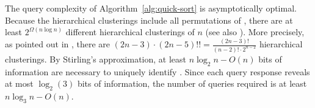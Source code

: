 The query complexity of 
Algorithm~\ref{alg:quick-sort} is asymptotically optimal.
Because the hierarchical clusterings include all permutations
of \AllElements,
there are at least $2^{\Omega(n \log n)}$ different hierarchical
clusterings of $n$ \elements (see also
\cite{vikram-dasgupta:2016:interactive-hierarchical-clustering}).
More precisely, as pointed out in \cite{felsenstein:2004:phylogenies},
there are $(2n-3) \cdot (2n-5)!! = \frac{(2n-3)!}{(n-2)! \cdot 2^{n-2}}$
hierarchical clusterings.
By Stirling's approximation,
at least $n \log_2 n - O(n)$ bits of information
are necessary to uniquely identify \TreeOpt.
Since each query response reveals at most $\log_2 (3)$ bits of
information, the number of queries required is at least
$n \log_3 n - O(n)$.


